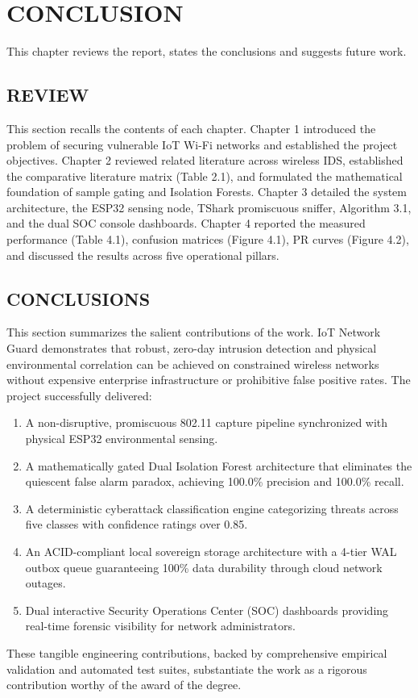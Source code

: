 \documentclass[11pt,a4paper]{report}
\begin{document}
\clearpage

\chapter{CONCLUSION}
This chapter reviews the report, states the conclusions and suggests future work.

\section{REVIEW}
This section recalls the contents of each chapter. Chapter 1 introduced the problem of securing vulnerable IoT Wi-Fi networks and established the project objectives. Chapter 2 reviewed related literature across wireless IDS, established the comparative literature matrix (Table 2.1), and formulated the mathematical foundation of sample gating and Isolation Forests. Chapter 3 detailed the system architecture, the ESP32 sensing node, TShark promiscuous sniffer, Algorithm 3.1, and the dual SOC console dashboards. Chapter 4 reported the measured performance (Table 4.1), confusion matrices (Figure 4.1), PR curves (Figure 4.2), and discussed the results across five operational pillars.

\section{CONCLUSIONS}
This section summarizes the salient contributions of the work. IoT Network Guard demonstrates that robust, zero-day intrusion detection and physical environmental correlation can be achieved on constrained wireless networks without expensive enterprise infrastructure or prohibitive false positive rates. The project successfully delivered:
\begin{enumerate}[leftmargin=*,itemsep=1.5pt,parsep=0pt,topsep=2pt]
    \item A non-disruptive, promiscuous 802.11 capture pipeline synchronized with physical ESP32 environmental sensing.
    \item A mathematically gated Dual Isolation Forest architecture that eliminates the quiescent false alarm paradox, achieving 100.0\% precision and 100.0\% recall.
    \item A deterministic cyberattack classification engine categorizing threats across five classes with confidence ratings over 0.85.
    \item An ACID-compliant local sovereign storage architecture with a 4-tier WAL outbox queue guaranteeing 100\% data durability through cloud network outages.
    \item Dual interactive Security Operations Center (SOC) dashboards providing real-time forensic visibility for network administrators.
\end{enumerate}
These tangible engineering contributions, backed by comprehensive empirical validation and automated test suites, substantiate the work as a rigorous contribution worthy of the award of the degree.
\end{document}
